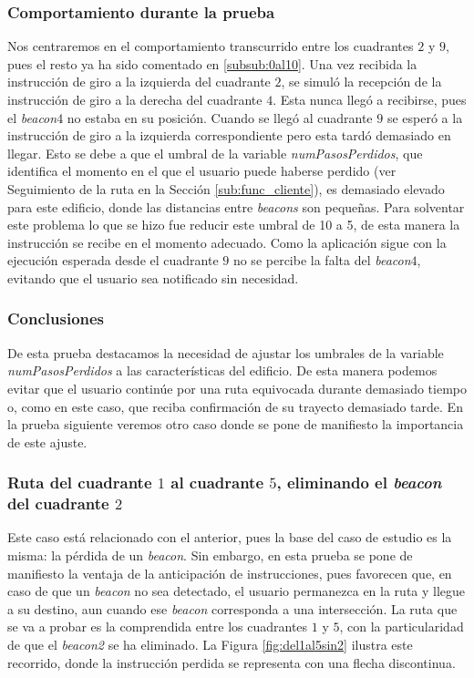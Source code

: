 \subsubsection*{Comportamiento durante la prueba}

Nos centraremos en el comportamiento transcurrido entre los cuadrantes $2$ y $9$, pues el resto ya ha sido comentado en \ref{subsub:0al10}. Una vez recibida la instrucción de giro a la izquierda del cuadrante $2$, se simuló la recepción de la instrucción de giro a la derecha del cuadrante $4$. Esta nunca llegó a recibirse, pues el \textit{beacon$4$} no estaba en su posición. Cuando se llegó al cuadrante $9$ se esperó a la instrucción de giro a la izquierda correspondiente pero esta tardó demasiado en llegar. Esto se debe a que el umbral de la variable \textit{numPasosPerdidos}, que identifica el momento en el que el usuario puede haberse perdido (ver Seguimiento de la ruta en la Sección \ref{sub:func_cliente}), es demasiado elevado para este edificio, donde las distancias entre \textit{beacons} son pequeñas. Para solventar este problema lo que se hizo fue reducir este umbral de 10 a 5, de esta manera la instrucción se recibe en el momento adecuado. Como la aplicación sigue con la ejecución esperada desde el cuadrante $9$ no se percibe la falta del \textit{beacon$4$}, evitando que el usuario sea notificado sin necesidad.


\subsubsection*{Conclusiones}

De esta prueba destacamos la necesidad de ajustar los umbrales de la variable \textit{numPasosPerdidos} a las características del edificio. De esta manera podemos evitar que el usuario continúe por una ruta equivocada durante demasiado tiempo o, como en este caso, que reciba confirmación de su trayecto demasiado tarde. En la prueba siguiente veremos otro caso donde se pone de manifiesto la importancia de este ajuste.


\subsubsection{Ruta del cuadrante $1$ al cuadrante $5$, eliminando el \textit{beacon} del cuadrante $2$}
\label{subsub:1al5sin2}

Este caso está relacionado con el anterior, pues la base del caso de estudio es la misma: la pérdida de un \textit{beacon}. Sin embargo, en esta prueba se pone de manifiesto la ventaja de la anticipación de instrucciones, pues favorecen que, en caso de que un \textit{beacon} no sea detectado, el usuario permanezca en la ruta y llegue a su destino, aun cuando ese \textit{beacon} corresponda a una intersección. La ruta que se va a probar es la comprendida entre los cuadrantes $1$ y $5$, con la particularidad de que el \textit{beacon2} se ha eliminado. La Figura \ref{fig:del1al5sin2} ilustra este recorrido, donde la instrucción perdida se representa con una flecha discontinua.

